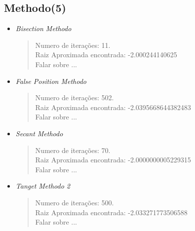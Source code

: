 \documentclass[12pt]{article}
\begin{document}
\subsection{Methodo(5)}
\begin{itemize}
    \item \textit{Bisection Methodo}\\
        \begin{verse}
          Numero de iterações: 11.\\
          Raiz Aproximada encontrada: -2.000244140625\\
          Falar sobre ...
        \end{verse}
    \item \textit{False Position Methodo}
        \begin{verse}
          Numero de iterações: 502.\\
          Raiz Aproximada encontrada: -2.0395668644382483\\
          Falar sobre ...
        \end{verse}
    \item \textit{Secant Methodo}
        \begin{verse}
          Numero de iterações: 70.\\
          Raiz Aproximada encontrada: -2.0000000005229315\\
          Falar sobre ...
        \end{verse}
    \item \textit{Tanget Methodo 2}
        \begin{verse}
          Numero de iterações: 500.\\
          Raiz Aproximada encontrada: -2.033271773506588 \\
          Falar sobre ...
        \end{verse}
\end{itemize}

\end{document}
